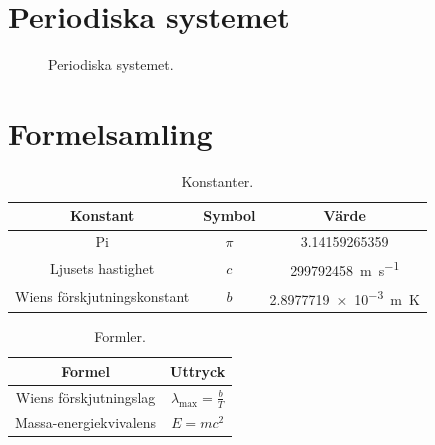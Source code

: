 \section{Periodiska systemet}
\vfill
\begin{figure}[h!]
    \centering
    \label{fig:periodic-table}
    \caption{Periodiska systemet.}
\end{figure}
\vfill
\pagebreak

\section{Formelsamling}
\centering
\begin{table}[h!]
    \def\arraystretch{1.5}
    \centering
    \caption{Konstanter.}\vspace{5pt}
    \begin{tabular}{c | c | c}
        \textbf{Konstant} & \textbf{Symbol} & \textbf{Värde} \\ \midrule
        Pi & $\pi$ & \num{3.14159265359} \\
        Ljusets hastighet & $c$ & \SI{299792458}{\m\per\s} \\
        Wiens förskjutningskonstant & $b$ & \SI{2.8977719e-3}{\m\kelvin}
    \end{tabular}

\end{table}

\begin{table}[h!]
    \def\arraystretch{1.5}
    \centering
    \caption{Formler.}\vspace{5pt}
    \begin{tabular}{c | c}
        \textbf{Formel} & \textbf{Uttryck} \\ \midrule
        Wiens förskjutningslag & $\displaystyle \lambda_\text{max} = \frac{b}{T}$ \\
        Massa-energiekvivalens & $\displaystyle E = mc^2$
    \end{tabular}

\end{table}